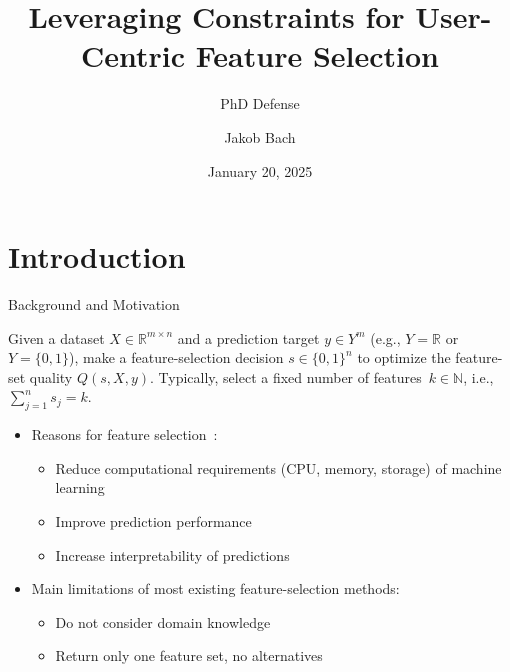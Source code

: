 \documentclass[en, navbarinline, handout]{sdqbeamer}
\title[Leveraging Constraints for User-Centric Feature Selection]{Leveraging Constraints for User-Centric Feature Selection} %
\subtitle{PhD Defense}
\author[Jakob Bach]{Jakob Bach} %
\date[2025-01-20]{January 20, 2025} %
\begin{document}
\KITtitleframe

\section{Introduction}

\begin{frame}[t]{Background and Motivation}
	\begin{definition}
		Given a dataset $X \in \mathbb{R}^{m \times n}$
		and a prediction target $y \in Y^m$ (e.g., $Y = \mathbb{R}$ or $Y = \{0, 1\}$),
		make a feature-selection decision $s \in \{0,1\}^n$
		to optimize the feature-set quality $Q(s,X,y)$.
		Typically, select a fixed number of features~$k \in \mathbb{N}$, i.e., $\sum_{j=1}^n s_j = k$.
	\end{definition}
	\pause
	\vspace{\baselineskip}
	\begin{itemize}
		\item Reasons for feature selection~\cite{chandrashekar2014survey, li2017feature}:
		\begin{itemize}
			\item Reduce computational requirements (CPU, memory, storage) of machine learning
			\item Improve prediction performance
			\item Increase interpretability of predictions
		\end{itemize}
		\pause
		\vspace{\baselineskip}
		\item Main limitations of most existing feature-selection methods:
		\begin{itemize}
			\item Do not consider domain knowledge
			\item Return only one feature set, no alternatives
		\end{itemize}
	\end{itemize}
\end{frame}
\end{document}

